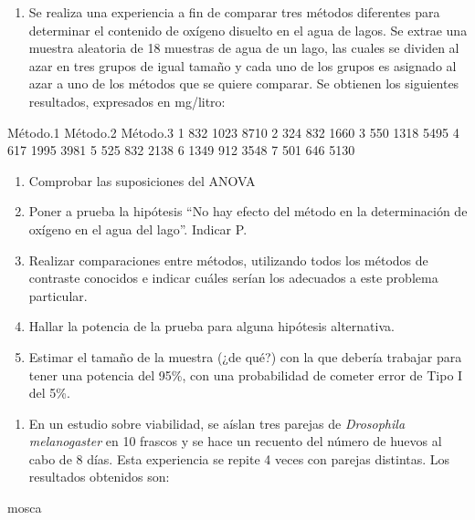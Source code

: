 \documentclass[]{book}
\newenvironment{Shaded}{\begin{snugshade}}{\end{snugshade}}
\newcommand{\NormalTok}[1]{#1}
\providecommand{\tightlist}{%
  \setlength{\itemsep}{0pt}\setlength{\parskip}{0pt}}
\theoremstyle{definition}
\theoremstyle{definition}
\theoremstyle{definition}
\theoremstyle{remark}
\begin{document}
\begin{enumerate}
\def\labelenumi{\arabic{enumi}.}
\setcounter{enumi}{4}
\tightlist
\item
  Se realiza una experiencia a fin de comparar tres métodos diferentes
  para determinar el contenido de oxígeno disuelto en el agua de lagos.
  Se extrae una muestra aleatoria de 18 muestras de agua de un lago, las
  cuales se dividen al azar en tres grupos de igual tamaño y cada uno de
  los grupos es asignado al azar a uno de los métodos que se quiere
  comparar. Se obtienen los siguientes resultados, expresados en
  mg/litro:
\end{enumerate}

Método.1 Método.2 Método.3 1 832 1023 8710 2 324 832 1660 3 550 1318
5495 4 617 1995 3981 5 525 832 2138 6 1349 912 3548 7 501 646 5130

\begin{enumerate}
\def\labelenumi{\alph{enumi})}
\tightlist
\item
  Comprobar las suposiciones del ANOVA
\item
  Poner a prueba la hipótesis ``No hay efecto del método en la
  determinación de oxígeno en el agua del lago''. Indicar P.
\item
  Realizar comparaciones entre métodos, utilizando todos los métodos de
  contraste conocidos e indicar cuáles serían los adecuados a este
  problema particular.
\item
  Hallar la potencia de la prueba para alguna hipótesis alternativa.
\item
  Estimar el tamaño de la muestra (¿de qué?) con la que debería trabajar
  para tener una potencia del 95\%, con una probabilidad de cometer
  error de Tipo I del 5\%.
\end{enumerate}

\begin{enumerate}
\def\labelenumi{\arabic{enumi}.}
\setcounter{enumi}{5}
\tightlist
\item
  En un estudio sobre viabilidad, se aíslan tres parejas de
  \emph{Drosophila melanogaster} en 10 frascos y se hace un recuento del
  número de huevos al cabo de 8 días. Esta experiencia se repite 4 veces
  con parejas distintas. Los resultados obtenidos son:
\end{enumerate}

\begin{Shaded}
\begin{Highlighting}[]
\NormalTok{mosca}
\end{Highlighting}
\end{Shaded}
\end{document}

